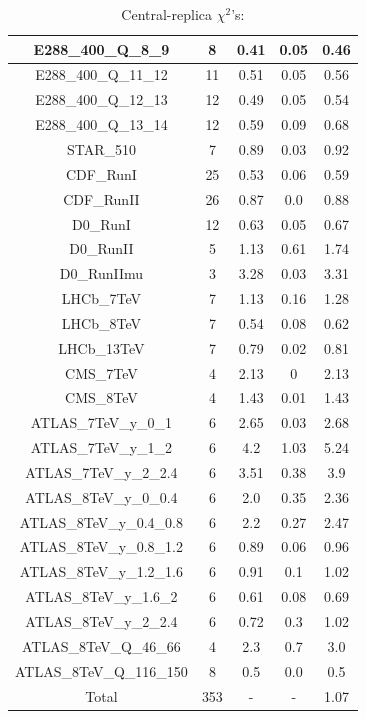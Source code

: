 \documentclass[
]{article}
\begin{document}
\begin{table}[h]
\begin{tabular}{|c|c|c|c|c|}
E288\_400\_Q\_8\_9 & 8 & 0.41 & 0.05 & 0.46 \\ \hline
E288\_400\_Q\_11\_12 & 11 & 0.51 & 0.05 & 0.56 \\ \hline
E288\_400\_Q\_12\_13 & 12 & 0.49 & 0.05 & 0.54 \\ \hline
E288\_400\_Q\_13\_14 & 12 & 0.59 & 0.09 & 0.68 \\ \hline
STAR\_510 & 7 & 0.89 & 0.03 & 0.92 \\ \hline
CDF\_RunI & 25 & 0.53 & 0.06 & 0.59 \\ \hline
CDF\_RunII & 26 & 0.87 & 0.0 & 0.88 \\ \hline
D0\_RunI & 12 & 0.63 & 0.05 & 0.67 \\ \hline
D0\_RunII & 5 & 1.13 & 0.61 & 1.74 \\ \hline
D0\_RunIImu & 3 & 3.28 & 0.03 & 3.31 \\ \hline
LHCb\_7TeV & 7 & 1.13 & 0.16 & 1.28 \\ \hline
LHCb\_8TeV & 7 & 0.54 & 0.08 & 0.62 \\ \hline
LHCb\_13TeV & 7 & 0.79 & 0.02 & 0.81 \\ \hline
CMS\_7TeV & 4 & 2.13 & 0 & 2.13 \\ \hline
CMS\_8TeV & 4 & 1.43 & 0.01 & 1.43 \\ \hline
ATLAS\_7TeV\_y\_0\_1 & 6 & 2.65 & 0.03 & 2.68 \\ \hline
ATLAS\_7TeV\_y\_1\_2 & 6 & 4.2 & 1.03 & 5.24 \\ \hline
ATLAS\_7TeV\_y\_2\_2.4 & 6 & 3.51 & 0.38 & 3.9 \\ \hline
ATLAS\_8TeV\_y\_0\_0.4 & 6 & 2.0 & 0.35 & 2.36 \\ \hline
ATLAS\_8TeV\_y\_0.4\_0.8 & 6 & 2.2 & 0.27 & 2.47 \\ \hline
ATLAS\_8TeV\_y\_0.8\_1.2 & 6 & 0.89 & 0.06 & 0.96 \\ \hline
ATLAS\_8TeV\_y\_1.2\_1.6 & 6 & 0.91 & 0.1 & 1.02 \\ \hline
ATLAS\_8TeV\_y\_1.6\_2 & 6 & 0.61 & 0.08 & 0.69 \\ \hline
ATLAS\_8TeV\_y\_2\_2.4 & 6 & 0.72 & 0.3 & 1.02 \\ \hline
ATLAS\_8TeV\_Q\_46\_66 & 4 & 2.3 & 0.7 & 3.0 \\ \hline
ATLAS\_8TeV\_Q\_116\_150 & 8 & 0.5 & 0.0 & 0.5 \\ \hline
Total & 353 & - & - & 1.07 \\ \hline

\end{tabular}

\caption{Central-replica \(\chi^2\)'s:}

\end{table}
\end{document}
